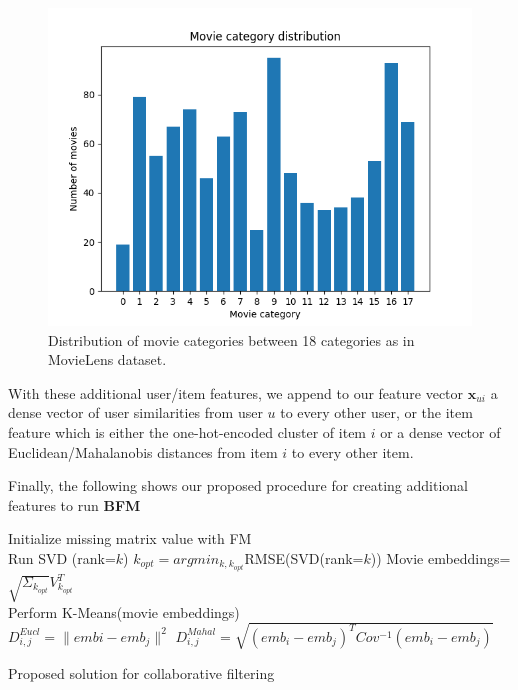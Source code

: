 \documentclass[10pt,conference,compsocconf]{IEEEtran}
\begin{document}
    \begin{figure}
        \includegraphics[width=\columnwidth]{figures/movie_category_distribution.png}
        \caption{Distribution of movie categories between 18 categories as in MovieLens dataset.}
        \label{fig:movie_category_distribution}
    \end{figure}

    With these additional user/item features, we append to our feature vector $\mathbf{x}_{ui}$ a dense vector of user similarities from user $u$ to every other user, or the item feature which is either the one-hot-encoded cluster of item $i$ or a dense vector of Euclidean/Mahalanobis distances from item $i$ to every other item.

    Finally, the following  shows our proposed procedure for creating additional features to run \textbf{BFM}

    \begin{algorithm}
        Initialize missing matrix value with FM\\
         {
            Run SVD (rank=$k$)
            $k_{opt}=argmin_{k, k_{opt}}$RMSE(SVD(rank=$k$))
        }
        Movie embeddings= $\sqrt{\Sigma_{k_{opt}}}V_{k_{opt}}^T$\\
        Perform K-Means(movie embeddings)\\
         {
             {
                $D_{i,j} ^{Eucl} = \|embi - emb_j\|^2$
            }
        }
         {
             {
                $D_{i,j} ^{Mahal} = \sqrt{(emb_i-emb_j)^TCov^{-1}(emb_i-emb_j)}$
            }
        }
        \caption{Proposed solution for collaborative filtering}
        \label{alg:algo1}
    \end{algorithm}
\end{document}
